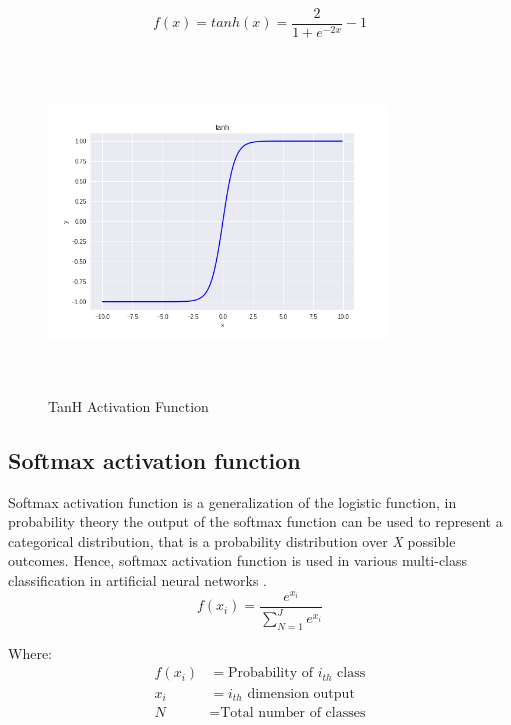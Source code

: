 \begin{equation}\label{eq:tanh}
f(x) = tanh(x)=\frac{2}{1+e^{-2x}} -1
\end{equation}
\begin{figure}[h]
\centering
\includegraphics[width=9cm, height=9cm, keepaspectratio]{pics/tanh_10.png}
\caption{TanH Activation Function}
\label{fig:tanh}
\end{figure} 

\subsection*{Softmax activation function}
Softmax activation function is a generalization of the logistic function, in probability theory the output of the softmax function can be used to represent a categorical distribution, that is a probability distribution over \textit{X} possible outcomes. Hence, softmax activation function is used in various multi-class classification in artificial neural networks \cite{wu2016deep}.
\begin{equation}\label{eq:softmax}
f(x_{i}) =\frac{e^{x_{i}}}{\sum_{N=1}^{J} e^{x_{i}} }     
\end{equation}

Where:
\begin{align*}
    f(x_{i}) &= \text{Probability of $i_{th}$ class}\\
    x_{i} &= \text{$i_{th}$ dimension output}\\
    N &= \text{Total number of classes}\\
\end{align*}

